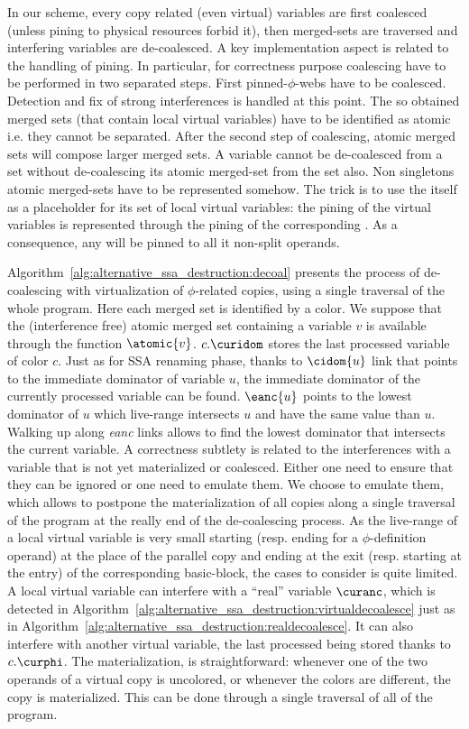 In our scheme, every copy related (even virtual) variables are first coalesced (unless pining to physical resources forbid it), then merged-sets are traversed and interfering variables are de-coalesced.
A key implementation aspect is related to the handling of pining. In particular, for correctness purpose coalescing have to be performed in two separated steps. First pinned-$\phi$-webs have to be coalesced. Detection and fix of strong interferences is handled at this point. The so obtained merged sets (that contain local virtual variables) have to be identified as atomic i.e. they cannot be separated. After the second step of coalescing, atomic merged sets will compose larger merged sets. A variable cannot be de-coalesced from a set without de-coalescing its atomic merged-set from the set also. Non singletons atomic merged-sets have to be represented somehow. The trick is to use the \phifun itself as a placeholder for its set of local virtual variables: the pining of the virtual variables is represented through the pining of the corresponding \phifun. As a consequence, any \phifun will be pinned to all it non-split operands. 

Algorithm~\ref{alg:alternative_ssa_destruction:decoal} presents the process of de-coalescing with virtualization of $\phi$-related copies, using a single traversal of the whole program. Here each merged set is identified by a color. We suppose that the (interference free) atomic merged set containing a variable $v$ is available through the function $\atomic{v}$. $c.\curidom$ stores the last processed variable of color $c$. Just as for SSA renaming phase, thanks to $\cidom{u}$ link that points to the immediate dominator of variable $u$, the immediate dominator of the currently processed variable can be found. $\eanc{u}$ points to the lowest dominator of $u$ which live-range intersects $u$ and have the same value than $u$. Walking up along \textit{eanc} links allows to find the lowest dominator that intersects the current variable. 
A correctness subtlety is related to the interferences with a variable that is not yet materialized or coalesced. Either one need to ensure that they can be ignored or one need to emulate them. We choose to emulate them, which allows to postpone the materialization of all copies along a single traversal of the program at the really end of the de-coalescing process. As the live-range of a local virtual variable is very small starting (resp. ending for a $\phi$-definition operand) at the place of the parallel copy and ending at the exit (resp. starting at the entry) of the corresponding basic-block, the cases to consider is quite limited. A local virtual variable can interfere with a ``real'' variable $\curanc$, which is detected in Algorithm~\ref{alg:alternative_ssa_destruction:virtualdecoalesce} just as in Algorithm~\ref{alg:alternative_ssa_destruction:realdecoalesce}. It can also interfere with another virtual variable, the last processed being stored thanks to $c.\curphi$.
The materialization, is straightforward: whenever one of the two operands of a virtual copy is uncolored, or whenever the colors are different, the copy is materialized. This can be done through a single traversal of all \phifuns of the program.





